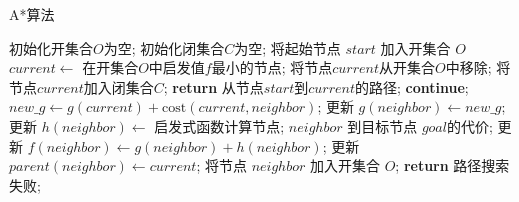 \begin{algorithm}[!b]
\caption{A*算法}
\label{alg:intro_Astar}
\begin{algorithmic}[1]
    \STATE 初始化开集合$O$为空;  %
    \STATE 初始化闭集合$C$为空;  %
    \STATE 将起始节点 $start$ 加入开集合 $O$
        \STATE $current \gets$ 在开集合$O$中启发值$f$最小的节点;  %
        \STATE 将节点$current$从开集合$O$中移除;
        \STATE 将节点$current$加入闭集合$C$;
            \STATE \textbf{return} 从节点$start$到$current$的路径;
        \ENDIF
                \STATE \textbf{continue};
            \ENDIF
            \STATE $new\_g \gets g(current) + \text{cost}(current, neighbor)$;  %
                \STATE 更新 $g(neighbor) \gets new\_g$;
                \STATE 更新 $h(neighbor) \gets$ 启发式函数计算节点; $neighbor$ 到目标节点 $goal$的代价;
                \STATE 更新 $f(neighbor) \gets g(neighbor) + h(neighbor)$;
                \STATE 更新 $parent(neighbor) \gets current$;
                    \STATE 将节点 $neighbor$ 加入开集合 $O$;
                \ENDIF
            \ENDIF
        \ENDFOR
    \ENDWHILE
    \STATE \textbf{return} 路径搜索失败;  %
\end{algorithmic}
\end{algorithm}

